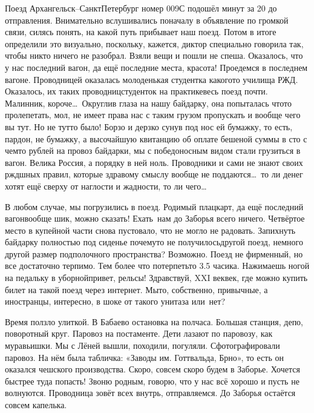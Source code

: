 Поезд Архангельск\nobreakdash--Санкт\sdash Петербург номер 009С подошёл минут за 20 до отправления. Внимательно вслушивались поначалу в объявление по громкой связи, силясь понять, на какой путь прибывает наш поезд. Потом в итоге определили это визуально, поскольку, кажется, диктор специально говорила так, чтобы никто ничего не разобрал. Взяли вещи и пошли не спеша. Оказалось, что у нас последний вагон, да ещё последние места, красота! Проедемся в последнем вагоне. Проводницей оказалась молоденькая студентка какого\sdash то училища РЖД. Оказалось, их таких проводниц\sdash студенток на практике\mdash весь поезд почти. Малинник, короче\ldots~Округлив глаза на нашу байдарку, она попыталась что\sdash то пролепетать, мол, не имеет права нас с таким грузом пропускать и вообще чего вы тут. Но не тут\sdash то было! Борзо и дерзко сунув под нос ей бумажку, то есть, пардон, не бумажку, а высочайшую квитанцию об оплате бешеной суммы в сто с чем\sdash то рублей на провоз байдарки, мы с победоносным видом стали грузиться в вагон. Велика Россия, а порядку в ней ноль. Проводники и сами не знают своих ржд\sdash шных правил, которые здравому смыслу вообще не поддаются\ldots~то ли денег хотят ещё сверху от наглости и жадности, то ли чего\ldots~

В любом случае, мы погрузились в поезд. Родимый плацкарт, да ещё последний вагон\mdash вообще шик, можно сказать! Ехать~нам до Заборья всего ничего. Четвёртое место в купейной части снова пустовало, что не могло не радовать. Запихнуть байдарку полностью под сиденье почему\sdash то не получилось\mdash другой поезд, немного другой размер подполочного пространства? Возможно. Поезд не фирменный, но все достаточно терпимо. Тем более что потерпеть\sdash то 3.5 часика. Нажимаешь ногой на педальку в уборной\mdash привет, рельсы! Здравствуй, XXI век\mdash век, где можно купить билет на такой поезд через интернет. Мы\sdash то, собственно, привычные, а иностранцы, интересно, в шоке от такого унитаза или~нет?

Время ползло улиткой. В Бабаево остановка на полчаса. Большая станция, депо, поворотный круг. Паровоз на постаменте. Дети лазают по паровозу, как муравьишки. Мы с Лёней вышли, походили, погуляли. Сфотографировали паровоз. На нём была табличка: «Заводы им. Готтвальда, Брно», то есть он оказался чешского производства. Скоро, совсем скоро будем в Заборье. Хочется быстрее туда попасть! Звоню родным, говорю, что у нас всё хорошо и пусть не волнуются. Проводница зовёт всех внутрь, отправляемся. До Заборья остаётся совсем капелька.

